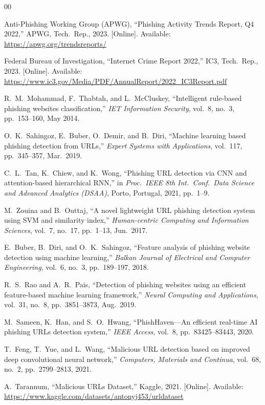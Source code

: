 \documentclass[conference]{IEEEtran}
\begin{document}
\begin{thebibliography}{00}

Anti-Phishing Working Group (APWG), ``Phishing Activity Trends 
Report, Q4 2022,'' APWG, Tech.\ Rep., 2023. [Online]. Available: 
\url{https://apwg.org/trendsreports/}

Federal Bureau of Investigation, ``Internet Crime Report 2022,'' 
IC3, Tech.\ Rep., 2023. [Online]. Available: 
\url{https://www.ic3.gov/Media/PDF/AnnualReport/2022_IC3Report.pdf}

R.\ M.\ Mohammad, F.\ Thabtah, and L.\ McCluskey, ``Intelligent 
rule-based phishing websites classification,'' \textit{IET 
Information Security}, vol.~8, no.~3, pp.~153--160, May 2014.

O.\ K.\ Sahingoz, E.\ Buber, O.\ Demir, and B.\ Diri, ``Machine 
learning based phishing detection from URLs,'' \textit{Expert 
Systems with Applications}, vol.~117, pp.~345--357, Mar.\ 2019.

C.\ L.\ Tan, K.\ Chiew, and K.\ Wong, ``Phishing URL detection 
via CNN and attention-based hierarchical RNN,'' in \textit{Proc.\ 
IEEE 8th Int.\ Conf.\ Data Science and Advanced Analytics 
(DSAA)}, Porto, Portugal, 2021, pp.~1--9.

M.\ Zouina and B.\ Outtaj, ``A novel lightweight URL phishing 
detection system using SVM and similarity index,'' 
\textit{Human-centric Computing and Information Sciences}, 
vol.~7, no.~17, pp.~1--13, Jun.\ 2017.

E.\ Buber, B.\ Diri, and O.\ K.\ Sahingoz, ``Feature analysis of 
phishing website detection using machine learning,'' 
\textit{Balkan Journal of Electrical and Computer Engineering}, 
vol.~6, no.~3, pp.~189--197, 2018.

R.\ S.\ Rao and A.\ R.\ Pais, ``Detection of phishing websites 
using an efficient feature-based machine learning framework,'' 
\textit{Neural Computing and Applications}, vol.~31, no.~8, 
pp.~3851--3873, Aug.\ 2019.

M.\ Sameen, K.\ Han, and S.\ O.\ Hwang, 
``PhishHaven---An efficient real-time AI phishing URLs detection 
system,'' \textit{IEEE Access}, vol.~8, pp.~83425--83443, 2020.

T.\ Feng, T.\ Yue, and L.\ Wang, ``Malicious URL detection based 
on improved deep convolutional neural network,'' 
\textit{Computers, Materials and Continua}, vol.~68, no.~2, 
pp.~2799--2813, 2021.

A.\ Tarannum, ``Malicious URLs Dataset,'' Kaggle, 2021. 
[Online]. Available: 
\url{https://www.kaggle.com/datasets/antonyj453/urldataset}

\end{thebibliography}
\end{document}
